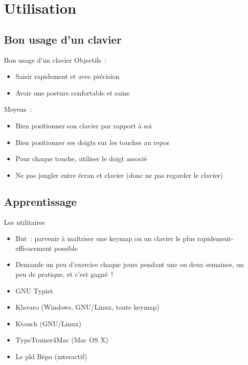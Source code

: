 \section{Utilisation}



\subsection{Bon usage d’un clavier}

\begin{frame}{Bon usage d’un clavier}
    Objectifs~:
    \begin{itemize}
        \item Saisir rapidement et avec précision \pause

        \item Avoir une posture confortable et saine
    \end{itemize}
    \pause

    Moyens~:
    \begin{itemize}
        \item Bien positionner son clavier par rapport à soi \pause

        \item Bien positionner ses doigts sur les touches au repos \pause

        \item Pour chaque touche, utiliser le doigt associé \pause

        \item Ne pas jongler entre écran et clavier (donc ne pas regarder le clavier)
    \end{itemize}
\end{frame}



\subsection{Apprentissage}

\begin{frame}{Les utilitaires}
    \begin{itemize}
        \item But~: parvenir à maîtriser une keymap ou un clavier le plus
          rapidement-efficacement possible \pause
        \item Demande un peu d’exercice chaque jours pendant une ou deux
          semaines, un peu de pratique, et c’est gagné~! \pause

	\item GNU Typist \pause
        \item Klavaro (Windows, GNU/Linux, toute keymap) \pause
        \item Ktouch (GNU/Linux) \pause
        \item TypeTrainer4Mac (Mac OS X) \pause
	\item Le pld Bépo (interactif)
    \end{itemize}
\end{frame}

